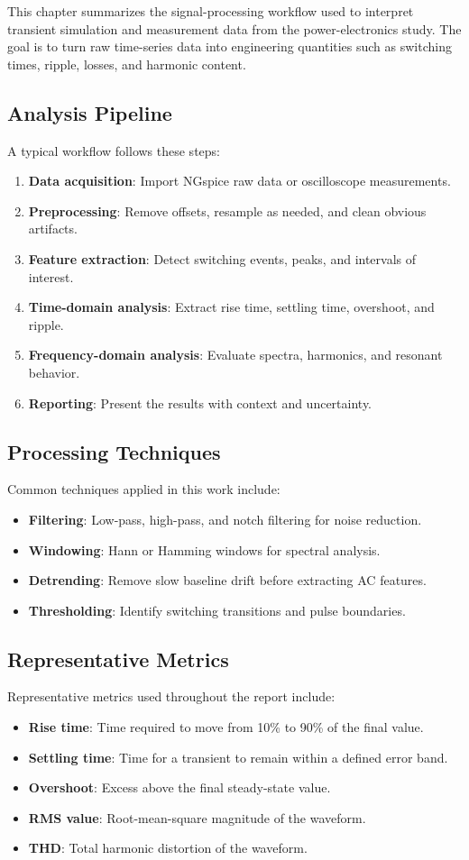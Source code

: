 This chapter summarizes the signal-processing workflow used to interpret transient simulation and measurement data from the power-electronics study. The goal is to turn raw time-series data into engineering quantities such as switching times, ripple, losses, and harmonic content.

\subsection{Analysis Pipeline}
A typical workflow follows these steps:
\begin{enumerate}
    \item \textbf{Data acquisition}: Import NGspice raw data or oscilloscope measurements.
    \item \textbf{Preprocessing}: Remove offsets, resample as needed, and clean obvious artifacts.
    \item \textbf{Feature extraction}: Detect switching events, peaks, and intervals of interest.
    \item \textbf{Time-domain analysis}: Extract rise time, settling time, overshoot, and ripple.
    \item \textbf{Frequency-domain analysis}: Evaluate spectra, harmonics, and resonant behavior.
    \item \textbf{Reporting}: Present the results with context and uncertainty.
\end{enumerate}

\subsection{Processing Techniques}
Common techniques applied in this work include:
\begin{itemize}
    \item \textbf{Filtering}: Low-pass, high-pass, and notch filtering for noise reduction.
    \item \textbf{Windowing}: Hann or Hamming windows for spectral analysis.
    \item \textbf{Detrending}: Remove slow baseline drift before extracting AC features.
    \item \textbf{Thresholding}: Identify switching transitions and pulse boundaries.
\end{itemize}

\subsection{Representative Metrics}
Representative metrics used throughout the report include:
\begin{itemize}
    \item \textbf{Rise time}: Time required to move from 10\% to 90\% of the final value.
    \item \textbf{Settling time}: Time for a transient to remain within a defined error band.
    \item \textbf{Overshoot}: Excess above the final steady-state value.
    \item \textbf{RMS value}: Root-mean-square magnitude of the waveform.
    \item \textbf{THD}: Total harmonic distortion of the waveform.
\end{itemize}

